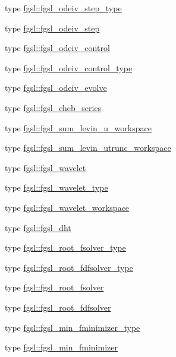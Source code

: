 \begin{DoxyCompactItemize}
\item 
type \hyperlink{structfgsl_1_1fgsl__odeiv__step__type}{fgsl\-::fgsl\-\_\-odeiv\-\_\-step\-\_\-type}
\item 
type \hyperlink{structfgsl_1_1fgsl__odeiv__step}{fgsl\-::fgsl\-\_\-odeiv\-\_\-step}
\item 
type \hyperlink{structfgsl_1_1fgsl__odeiv__control}{fgsl\-::fgsl\-\_\-odeiv\-\_\-control}
\item 
type \hyperlink{structfgsl_1_1fgsl__odeiv__control__type}{fgsl\-::fgsl\-\_\-odeiv\-\_\-control\-\_\-type}
\item 
type \hyperlink{structfgsl_1_1fgsl__odeiv__evolve}{fgsl\-::fgsl\-\_\-odeiv\-\_\-evolve}
\item 
type \hyperlink{structfgsl_1_1fgsl__cheb__series}{fgsl\-::fgsl\-\_\-cheb\-\_\-series}
\item 
type \hyperlink{structfgsl_1_1fgsl__sum__levin__u__workspace}{fgsl\-::fgsl\-\_\-sum\-\_\-levin\-\_\-u\-\_\-workspace}
\item 
type \hyperlink{structfgsl_1_1fgsl__sum__levin__utrunc__workspace}{fgsl\-::fgsl\-\_\-sum\-\_\-levin\-\_\-utrunc\-\_\-workspace}
\item 
type \hyperlink{structfgsl_1_1fgsl__wavelet}{fgsl\-::fgsl\-\_\-wavelet}
\item 
type \hyperlink{structfgsl_1_1fgsl__wavelet__type}{fgsl\-::fgsl\-\_\-wavelet\-\_\-type}
\item 
type \hyperlink{structfgsl_1_1fgsl__wavelet__workspace}{fgsl\-::fgsl\-\_\-wavelet\-\_\-workspace}
\item 
type \hyperlink{structfgsl_1_1fgsl__dht}{fgsl\-::fgsl\-\_\-dht}
\item 
type \hyperlink{structfgsl_1_1fgsl__root__fsolver__type}{fgsl\-::fgsl\-\_\-root\-\_\-fsolver\-\_\-type}
\item 
type \hyperlink{structfgsl_1_1fgsl__root__fdfsolver__type}{fgsl\-::fgsl\-\_\-root\-\_\-fdfsolver\-\_\-type}
\item 
type \hyperlink{structfgsl_1_1fgsl__root__fsolver}{fgsl\-::fgsl\-\_\-root\-\_\-fsolver}
\item 
type \hyperlink{structfgsl_1_1fgsl__root__fdfsolver}{fgsl\-::fgsl\-\_\-root\-\_\-fdfsolver}
\item 
type \hyperlink{structfgsl_1_1fgsl__min__fminimizer__type}{fgsl\-::fgsl\-\_\-min\-\_\-fminimizer\-\_\-type}
\item 
type \hyperlink{structfgsl_1_1fgsl__min__fminimizer}{fgsl\-::fgsl\-\_\-min\-\_\-fminimizer}
\item 

\end{DoxyCompactItemize}
